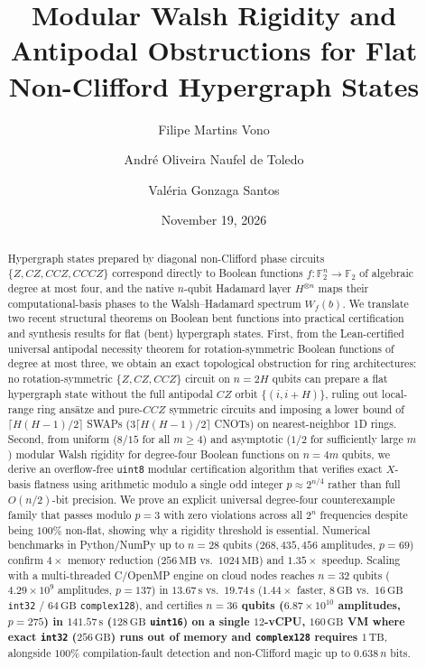 \documentclass[11pt,a4paper]{article}
\title{\textbf{Modular Walsh Rigidity and Antipodal Obstructions for Flat Non-Clifford Hypergraph States}}
\author{
  Filipe Martins Vono \and
  Andr\'e Oliveira Naufel de Toledo \and
  Val\'eria Gonzaga Santos
}
\date{November 19, 2026}
\newcommand{\F}{\mathbb{F}}
\begin{document}
\maketitle

\begin{abstract}
Hypergraph states prepared by diagonal non-Clifford phase circuits $\{Z, CZ, CCZ, CCCZ\}$ correspond directly to Boolean functions $f:\F_2^n\to\F_2$ of algebraic degree at most four, and the native $n$-qubit Hadamard layer $H^{\otimes n}$ maps their computational-basis phases to the Walsh--Hadamard spectrum $W_f(b)$. We translate two recent structural theorems on Boolean bent functions into practical certification and synthesis results for flat (bent) hypergraph states. First, from the Lean-certified universal antipodal necessity theorem for rotation-symmetric Boolean functions of degree at most three, we obtain an exact topological obstruction for ring architectures: no rotation-symmetric $\{Z, CZ, CCZ\}$ circuit on $n=2H$ qubits can prepare a flat hypergraph state without the full antipodal $CZ$ orbit $\{(i, i+H)\}$, ruling out local-range ring ans\"atze and pure-$CCZ$ symmetric circuits and imposing a lower bound of $\lceil H(H-1)/2 \rceil$ SWAPs ($3\lceil H(H-1)/2 \rceil$ CNOTs) on nearest-neighbor 1D rings. Second, from uniform ($8/15$ for all $m\ge 4$) and asymptotic ($1/2$ for sufficiently large $m$) modular Walsh rigidity for degree-four Boolean functions on $n=4m$ qubits, we derive an overflow-free \texttt{uint8} modular certification algorithm that verifies exact $X$-basis flatness using arithmetic modulo a single odd integer $p \approx 2^{n/4}$ rather than full $O(n/2)$-bit precision. We prove an explicit universal degree-four counterexample family that passes modulo $p=3$ with zero violations across all $2^n$ frequencies despite being $100\%$ non-flat, showing why a rigidity threshold is essential. Numerical benchmarks in Python/NumPy up to $n=28$ qubits ($268{,}435{,}456$ amplitudes, $p=69$) confirm $4\times$ memory reduction ($256\,\text{MB}$ vs.\ $1024\,\text{MB}$) and $1.35\times$ speedup. Scaling with a multi-threaded C/OpenMP engine on cloud nodes reaches $n=32$ qubits ($4.29 \times 10^9$ amplitudes, $p=137$) in $13.67\,\text{s}$ vs.\ $19.74\,\text{s}$ ($1.44\times$ faster, $8\,\text{GB}$ vs.\ $16\,\text{GB}$ \texttt{int32} / $64\,\text{GB}$ \texttt{complex128}), and certifies \textbf{$n=36$ qubits ($6.87 \times 10^{10}$ amplitudes, $p=275$) in $141.57\,\text{s}$ ($128\,\text{GB}$ \texttt{uint16}) on a single $12$-vCPU, $160\,\text{GB}$ VM where exact \texttt{int32} ($256\,\text{GB}$) runs out of memory and \texttt{complex128} requires $1\,\text{TB}$}, alongside $100\%$ compilation-fault detection and non-Clifford magic up to $0.638\,n$ bits.
\end{abstract}
\end{document}
